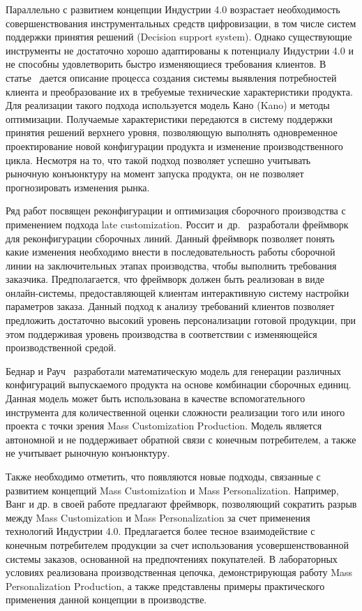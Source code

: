 Параллельно с развитием концепции Индустрии 4.0 возрастает необходимость совершенствования инструментальных средств цифровизации, в том числе систем поддержки принятия решений (Decision support system). Однако существующие инструменты не достаточно хорошо адаптированы к потенциалу Индустрии 4.0 и не способны удовлетворить быстро изменяющиеся требования клиентов. В статье~\cite{lee2019developing} дается описание процесса создания системы выявления потребностей клиента и преобразование их в требуемые технические характеристики продукта. Для реализации такого подхода используется модель Кано (Kano) и методы оптимизации. Получаемые характеристики передаются в систему поддержки принятия решений верхнего уровня, позволяющую выполнять одновременное проектирование новой конфигурации продукта и изменение производственного цикла. Несмотря на то, что такой подход позволяет успешно учитывать рыночную конъюнктуру на момент запуска продукта, он не позволяет прогнозировать изменения рынка.

Ряд работ посвящен реконфигурации и оптимизация сборочного производства с применением подхода late customization. Россит и~др.~\cite{rossit2019industry} разработали фреймворк для реконфигурации сборочных линий. Данный фреймворк позволяет понять какие изменения необходимо внести в последовательность работы сборочной линии на заключительных этапах производства, чтобы выполнить требования заказчика. Предполагается, что фреймворк должен быть реализован в виде онлайн-системы, предоставляющей клиентам интерактивную систему настройки параметров заказа. Данный подход к анализу требований клиентов позволяет предложить достаточно высокий уровень персонализации готовой продукции, при этом поддерживая уровень производства в соответствии с изменяющейся производственной средой.

Беднар и Рауч~\cite{bednar2019modeling} разработали математическую модель для генерации различных конфигураций выпускаемого продукта на основе комбинации сборочных единиц. Данная модель может быть использована в качестве вспомогательного инструмента для количественной оценки сложности реализации того или иного проекта с точки зрения Mass Customization Production. Модель является автономной и не поддерживает обратной связи с конечным потребителем, а также не учитывает рыночную конъюнктуру.

Также необходимо отметить, что появляются новые подходы, связанные с развитием концепций Mass Customization и Mass Personalization. Например, Ванг и др. \cite{wang2017industry} в своей работе предлагают фреймворк, позволяющий сократить разрыв между Mass Customization и Mass Personalization за счет применения технологий Индустрии 4.0. Предлагается более тесное взаимодействие с конечным потребителем продукции за счет использования усовершенствованной системы заказов, основанной на предпочтениях покупателей. В лабораторных условиях реализована производственная цепочка, демонстрирующая работу Mass Personalization Production, а также представлены примеры практического применения данной концепции в производстве.

